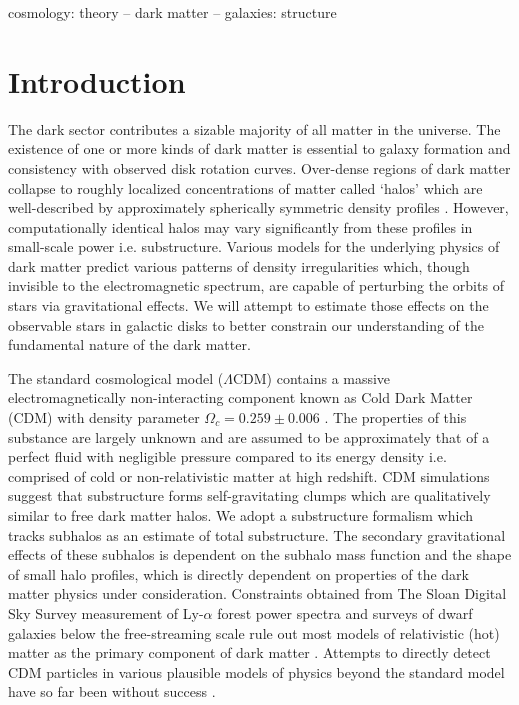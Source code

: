\documentclass[usenatbib]{mnras}
\newcommand{\lcdm}{$\Lambda$CDM}
\begin{document}
\begin{keywords}
cosmology: theory -- dark matter -- galaxies: structure
\end{keywords}

\section{Introduction}

The dark sector contributes a sizable majority of all matter in the universe. The existence of one or more kinds of dark matter is essential to galaxy formation and consistency with observed disk rotation curves. Over-dense regions of dark matter collapse to roughly localized concentrations of matter called ‘halos’ which are well-described by approximately spherically symmetric density profiles \citep{structure}. However, computationally identical halos may vary significantly from these profiles in small-scale power i.e. substructure. Various models for the underlying physics of dark matter predict various patterns of density irregularities which, though invisible to the electromagnetic spectrum, are capable of perturbing the orbits of stars via gravitational effects. We will attempt to estimate those effects on the observable stars in galactic disks to better constrain our understanding of the fundamental nature of the dark matter.
             
\par 

The standard cosmological model (\lcdm) contains a massive electromagnetically non-interacting component known as Cold Dark Matter (CDM) with density parameter $\Omega_c = 0.259 \pm 0.006$ \citep{planck}. The properties of this substance are largely unknown and are assumed to be approximately that of a perfect fluid with negligible pressure compared to its energy density i.e. comprised of cold or non-relativistic matter at high redshift. CDM simulations suggest that substructure forms self-gravitating clumps which are qualitatively similar to free dark matter halos. We adopt a substructure formalism which tracks subhalos as an estimate of total substructure. The secondary gravitational effects of these subhalos is dependent on the subhalo mass function and the shape of small halo profiles, which is directly dependent on properties of the dark matter physics under consideration. Constraints obtained from The Sloan Digital Sky Survey measurement of Ly-$\alpha$ forest power spectra and surveys of dwarf galaxies below the free-streaming scale rule out most models of relativistic (hot) matter as the primary component of dark matter \citep{can_neutrinos}. Attempts to directly detect CDM particles in various plausible models of physics beyond the standard model have so far been without success \citep{direct_detection}.
	  
\end{document}
